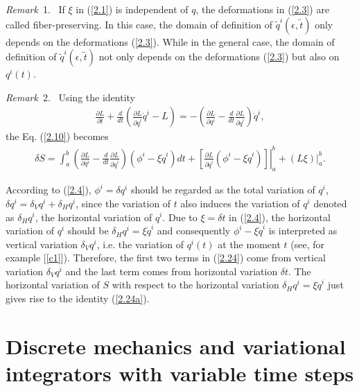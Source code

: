 \documentclass[a4paper,a4paper]{article}
\def\sect#1{\section{#1}\setcounter{equation}{0}}
\begin{document}
 \vskip10pt 
 \noindent
 {\em Remark} \,1. \, If $\xi$ in
(\ref{2.1}) is independent of $q$, the deformations in
(\ref{2.3}) are called fiber-preserving. In this case, the domain
of definition of $\tilde{q}^i(\epsilon, \tilde{t})$ only depends
on the deformations (\ref{2.3}). While in the general case, the
domain of definition of $\tilde{q}^i(\epsilon, \tilde{t})$ not
only depends on
the deformations (\ref{2.3}) but also on $q^i(t)$. %

\vskip10pt
\noindent
{\em Remark}\, 2. \, Using the identity %
\begin{align}
\frac{\partial L}{\partial t}+\frac{d}{dt}\left(
           \frac{\partial L}{\partial \dot{q}^i}\dot{q}^i-L\right)
=-\left(\frac{\partial L}{\partial q^i}-\frac{d}{dt}\frac{\partial
L}{\partial \dot{q}^i}
          \right)\dot{q}^i, \label{2.24a}
\end{align}
the Eq. (\ref{2.10}) becomes
\begin{align}
\delta S=\int_{a}^{b}\left(\frac{\partial L}{\partial
q^i}-\frac{d}{dt}
         \frac{\partial L}{\partial \dot{q}^i}\right)(\phi^i-\xi \dot{q}^i)dt
          +\left.\left[\frac{\partial L}{\partial \dot{q}^i}(\phi^i-\xi \dot{q}^i)
           \right]\right|_{a}^{b}+ \left.(L\xi)\right|_{a}^{b}.\label{2.24}
\end{align}

According to (\ref{2.4}), $\phi^i=\delta q^i$ should be regarded
as the total variation of $q^i$, $\delta q^i=\delta_V q^i
+\delta_H q^i$, since the variation of $t$ also induces the
variation of $q^i$ denoted as $\delta_H q^i$, the horizontal
variation of $ q^i$. Due to $\xi=\delta t$ in (\ref{2.4}), the
horizontal variation of $ q^i$ should be  $\delta_H q^i=\xi
\dot{q}^i$ and consequently $\phi^i-\xi \dot{q}^i$ is interpreted
as vertical variation $\delta_V q^i$, i.e. the variation of
$q^i(t)$
at the moment $t$ (see, for example [\ref{c1}]). %
Therefore, the first two terms in (\ref{2.24}) come from vertical
variation $\delta_V q^i$ and the last term comes from horizontal
variation $\delta t$.  The horizontal variation of $S$ with
respect to the horizontal variation  $\delta_H q^i=\xi \dot{q}^i$
just gives rise to the identity (\ref{2.24a}).



\vskip5pt
\sect{Discrete mechanics and variational integrators with variable
time steps }
\end{document}
